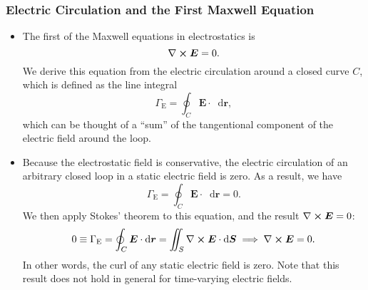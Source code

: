 \documentclass[11pt, a4paper]{article}
\newcommand{\diff}{\mathop{}\!\mathrm{d}} %
\renewcommand{\vec}[1]{\bm{#1}} %
\renewcommand{\r}{\vec{r}}
\newcommand{\E}{\vec{E}} %
\renewcommand{\curl}{\nabla \cross}
\begin{document}
\subsubsection{Electric Circulation and the First Maxwell Equation}
\begin{itemize}
    \item The first of the Maxwell equations in electrostatics is
    \begin{equation*}
        \curl \E = 0.
    \end{equation*}
    We derive this equation from the electric circulation around a closed curve $ C $, which is defined as the line integral
    \begin{equation*}
        \Gamma_{\text{E}} = \oint_{C} \E \cdot \diff \r,
    \end{equation*}
    which can be thought of a ``sum'' of the tangentional component of the electric field around the loop. 

    \item Because the electrostatic field is conservative, the electric circulation of an arbitrary closed loop in a static electric field is zero. As a result, we have
    \begin{equation*}
        \Gamma_{\text{E}} = \oint_{C} \E \cdot \diff \r = 0.
    \end{equation*}
    We then apply Stokes' theorem to this equation, and the result $ \curl \E = 0 $:
    \begin{equation*}
        0 \equiv \Gamma_{\text{E}} = \oint_{C}\E \cdot \diff \r = \iint_{S} \curl \E \cdot \diff \vec{S} \implies \curl \E = 0.
    \end{equation*}
    In other words, the curl of any static electric field is zero. Note that this result does not hold in general for time-varying electric fields.

\end{itemize}
\end{document}
